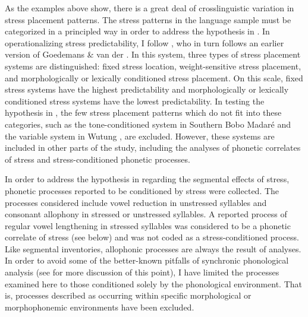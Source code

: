   As the examples above show, there is a great deal of crosslinguistic variation in stress placement patterns. The stress patterns in the language sample must be categorized in a principled way in order to address the hypothesis in . In operationalizing stress predictability, I follow \citet{Schiering2007}, who in turn follows an earlier version of Goedemans \& van der \citet{Hulst2013a}. In this system, three types of stress placement systems are distinguished: fixed stress location, weight-sensitive stress placement, and morphologically or lexically conditioned stress placement. On this scale, fixed stress systems have the highest predictability and morphologically or lexically conditioned stress systems have the lowest predictability. In testing the hypothesis in , the few stress placement patterns which do not fit into these categories, such as the tone-conditioned system in Southern Bobo Madaré  and the variable system in Wutung , are excluded. However, these systems are included in other parts of the study, including the analyses of phonetic correlates of stress and stress-conditioned phonetic processes.

  In order to address the hypothesis in  regarding the segmental effects of stress, phonetic processes reported to be conditioned by stress were collected. The processes considered include vowel reduction in unstressed syllables and consonant allophony in stressed or unstressed syllables. A reported process of regular vowel lengthening in stressed syllables was considered to be a phonetic correlate of stress (see below) and was not coded as a stress-conditioned process. Like segmental inventories, allophonic processes are always the result of analyses. In order to avoid some of the better-known pitfalls of synchronic phonological analysis (see  for more discussion of this point), I have limited the processes examined here to those conditioned solely by the phonological environment. That is, processes described as occurring within specific morphological or morphophonemic environments have been excluded.

